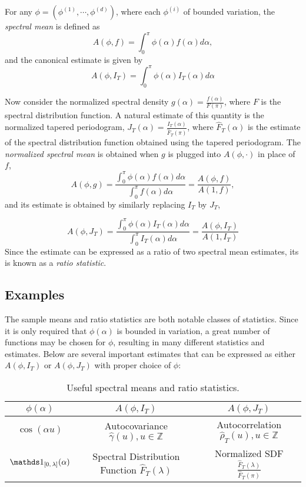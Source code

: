 For any $\phi = (\phi^{(1)},\cdots,\phi^{(d)})$, where each $\phi^{(i)}$ of bounded variation, the \textit{spectral mean} is defined as
	\[
	A(\phi, f) = \int_0^\pi \phi(\alpha)f(\alpha)d\alpha,
	\]
and the canonical estimate is given by
	\[
	A(\phi,I_T) = \int_0^\pi \phi(\alpha)I_T(\alpha)d\alpha
	\]

Now consider the normalized spectral density $g(\alpha) = \frac{f(\alpha)}{F(\pi)}$, where $F$ is the spectral distribution function. A natural estimate of this quantity is the normalized tapered periodogram, $J_T(\alpha)=\frac{I_T(\alpha)}{\hat{F}_T(\pi)}$, where $\hat{F}_T(\alpha)$ is the estimate of the spectral distribution function obtained using the tapered periodogram. The \textit{normalized spectral mean} is obtained when $g$ is plugged into $A(\phi,\cdot)$ in place of $f$,
	\[
	 A(\phi,g)=\frac{\int_0^\pi \phi(\alpha)f(\alpha)d\alpha}{\int_0^\pi f(\alpha)d\alpha} = \frac{A(\phi,f)}{A(1,f)},
	\]
and its estimate is obtained by similarly replacing $I_T$ by $J_T$,

	\[
	 A(\phi,J_T)=\frac{\int_0^\pi \phi(\alpha)I_T(\alpha)d\alpha}{\int_0^\pi I_T(\alpha)d\alpha} = \frac{A(\phi,I_T)}{A(1,I_T)}
	\]
Since the estimate can be expressed as a ratio of two spectral mean estimates, its is known as a \textit{ratio statistic}.


\subsection*{Examples}

The sample means and ratio statistics are both notable classes of statistics. Since it is only required that $\phi(\alpha)$ is bounded in variation, a great number of functions may be chosen for $\phi$, resulting in many different statistics and estimates. Below are several important estimates that can be expressed as either $A(\phi, I_T)$ or $A(\phi, J_T)$ with proper choice of $\phi$:\\

\begin{table}[h!]
\centering
\begin{tabular}{ccc}
\toprule
$\phi(\alpha)$ & $A(\phi,I_T)$ & $A(\phi,J_T)$ \\
\midrule
$\cos(\alpha u)$ & Autocovariance $\hat{\gamma}(u), u \in \mathbb{Z}$  &  Autocorrelation $\hat{\rho}_T(u), u \in \mathbb{Z}$ \\
$\on{[0,\lambda]}(\alpha)$ & Spectral Distribution Function $\hat{F}_T(\lambda)$ & Normalized SDF $\frac{\hat{F}_T(\lambda)}{\hat{F}_T(\pi)}$\\
\bottomrule
\end{tabular}
\caption{Useful spectral means and ratio statistics.}
\label{ratio}
\end{table}


